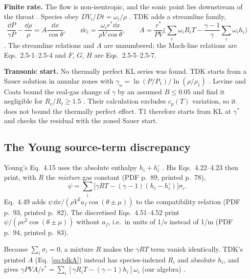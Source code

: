 \textbf{Finite rate.} The flow is non-isentropic, and the sonic point lies downstream
of the throat \cite[PDF p.~704, printed p.~688]{anderson}. Species obey
$DY_i/Dt=\dot\omega_i/\rho$ \cite[PDF p.~687, Eq.~17.42]{anderson}. TDK adds a
streamline family,
\begin{equation}
\frac{\dd P}{\gamma P}-\frac{\dd\rho}{\rho}=A\frac{\dd x}{\cos\theta},\qquad
\dd c_i=\frac{\omega_ir^*\dd x}{\rho V\cos\theta},\qquad
A=\frac{r^*}{PV}\Big(\sum_i\omega_iR_iT-\frac{\gamma-1}{\gamma}\sum_i\omega_ih_i\Big)
\label{eq:tdkA}
\end{equation}
\cite[PDF pp.~54--55, printed pp.~2-32--2-33]{nickerson1985}. The streamline relations
and $A$ are unnumbered; the Mach-line relations are Eqs.~2.5-1--2.5-4 and $F$, $G$, $H$
are Eqs.~2.5-5--2.5-7.

\textbf{Transonic start.} No thermally perfect KL series was found. TDK starts from a
Sauer solution in annular zones with $\gamma_n=\ln(P/P_1)/\ln(\rho/\rho_1)$
\cite[PDF pp.~41--46]{nickerson1985}. Levine and Coats bound the real-gas change of
$\gamma$ by an assumed $B\le0.05$ and find it negligible for $R_c/R_t\ge1.5$
\cite[PDF pp.~49--50, printed pp.~41--42]{levine1970}. Their calculation excludes
$c_p(T)$ variation, so it does not bound the thermally perfect effect. T1 therefore
starts from KL at $\gamma^*$ and checks the residual with the zoned Sauer start.

\subsection{The Young source-term discrepancy}
Young's Eq.~4.15 uses the absolute enthalpy $h_i+h_i^\circ$
\cite[PDF p.~88, printed p.~77]{young}. His Eqs.~4.22--4.23 then print, with $R$ the
\emph{mixture} gas constant (PDF p.~89, printed p.~78),
\begin{equation}
\psi=\sum_i\big[\gamma RT-(\gamma-1)(h_i-h_i^\circ)\big]\sigma_i .
\end{equation}
Eq.~4.49 adds $\psi\,\dd x/(\rho V^2a_f\cos(\theta\pm\mu))$ to the compatibility
relation (PDF p.~93, printed p.~82). The discretised Eqs.~4.51--4.52 print
$\psi/(\rho v^2\cos(\theta\pm\mu))$ without $a_f$, i.e.\ in units of 1/s instead of
1/m (PDF p.~94, printed p.~83).

Because $\sum_i\sigma_i=0$, a mixture $R$ makes the $\gamma RT$ term vanish
identically. TDK's printed $A$ (Eq.~\ref{eq:tdkA}) instead has species-indexed $R_i$
and absolute $h_i$, and gives
$\gamma PVA/r^*=\sum_i[\gamma R_iT-(\gamma-1)h_i]\omega_i$ (our algebra)
\cite[PDF p.~55, printed p.~2-33]{nickerson1985}\cite[PDF p.~47, printed p.~2-30]{nickerson1973}.

